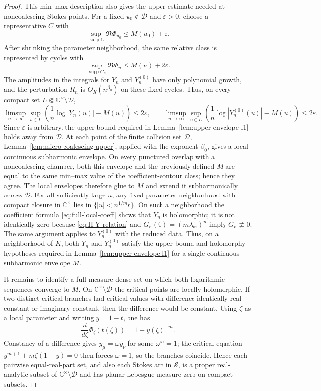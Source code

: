 \documentclass[reqno]{article}
\theoremstyle{definition}
\theoremstyle{remark}
\theoremstyle{plain}
\newcommand{\C}{\mathbb C}
\begin{document}
\begin{proof}
This min--max description also gives the upper estimate needed at noncoalescing Stokes points. For a fixed $u_0\notin\mathcal D$ and $\varepsilon>0$, choose a representative $C$ with
\[
\sup_{\operatorname{supp}C}\Re\Phi_{u_0}\le M(u_0)+\varepsilon .
\]
After shrinking the parameter neighborhood, the same relative class is represented by cycles with
\[
\sup_{\operatorname{supp}C_u}\Re\Phi_u\le M(u)+2\varepsilon .
\]
The amplitudes in the integrals for $Y_n$ and $Y_n^{(0)}$ have only polynomial growth, and the perturbation $R_n$ is $O_K(n^{\beta_0})$ on these fixed cycles. Thus, on every compact set $L\Subset\C^\times\setminus\mathcal D$,
\[
\limsup_{n\to\infty}\sup_{u\in L}\left(\frac1n\log|Y_n(u)|-M(u)\right)\le 2\varepsilon,
\qquad
\limsup_{n\to\infty}\sup_{u\in L}\left(\frac1n\log|Y_n^{(0)}(u)|-M(u)\right)\le 2\varepsilon .
\]
Since $\varepsilon$ is arbitrary, the upper bound required in Lemma~\ref{lem:upper-envelope-l1} holds away from $\mathcal D$. At each point of the finite collision set $\mathcal D$, Lemma~\ref{lem:micro-coalescing-upper}, applied with the exponent $\beta_0$, gives a local continuous subharmonic envelope. On every punctured overlap with a noncoalescing chamber, both this envelope and the previously defined $M$ are equal to the same min--max value of the coefficient-contour class; hence they agree. The local envelopes therefore glue to $M$ and extend it subharmonically across $\mathcal D$. For all sufficiently large $n$, any fixed parameter neighborhood with compact closure in $\C^\times$ lies in $\{|u|<n^{1/m}r\}$. On such a neighborhood the coefficient formula \eqref{eq:full-local-coeff} shows that $Y_n$ is holomorphic; it is not identically zero because \eqref{eq:H-Y-relation} and $G_n(0)=(m\lambda_m)^n$ imply $G_n\not\equiv0$. The same argument applies to $Y_n^{(0)}$ with the reduced data. Thus, on a neighborhood of $K$, both $Y_n$ and $Y_n^{(0)}$ satisfy the upper-bound and holomorphy hypotheses required in Lemma~\ref{lem:upper-envelope-l1} for a single continuous subharmonic envelope $M$.

It remains to identify a full-measure dense set on which both logarithmic sequences converge to $M$. On $\C^\times\setminus\mathcal D$ the critical points are locally holomorphic. If two distinct critical branches had critical values with difference identically real-constant or imaginary-constant, then the difference would be constant. Using $\zeta$ as a local parameter and writing $y=1-t$, one has
\[
\frac{d}{d\zeta}\Phi_\zeta(t(\zeta))=1-y(\zeta)^{-m}.
\]
Constancy of a difference gives $y_\mu=\omega y_\nu$ for some $\omega^m=1$; the critical equation $y^{m+1}+m\zeta(1-y)=0$ then forces $\omega=1$, so the branches coincide. Hence each pairwise equal-real-part set, and also each Stokes arc in $\mathcal S$, is a proper real-analytic subset of $\C^\times\setminus\mathcal D$ and has planar Lebesgue measure zero on compact subsets.


\end{proof}
\end{document}
